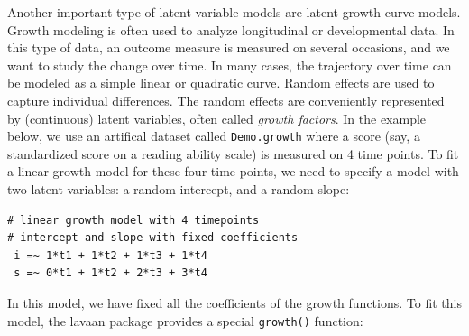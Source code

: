 Another important type of latent variable models are latent growth curve
models. Growth modeling is often used to analyze longitudinal or
developmental data. In this type of data, an outcome measure is measured
on several occasions, and we want to study the change over time. In many
cases, the trajectory over time can be modeled as a simple linear or
quadratic curve. Random effects are used to capture individual
differences. The random effects are conveniently represented by
(continuous) latent variables, often called \emph{growth factors}. In
the example below, we use an artifical dataset called
\texttt{Demo.growth} where a score (say, a standardized score on a
reading ability scale) is measured on 4 time points. To fit a linear
growth model for these four time points, we need to specify a model with
two latent variables: a random intercept, and a random slope:

\begin{verbatim}
# linear growth model with 4 timepoints
# intercept and slope with fixed coefficients
 i =~ 1*t1 + 1*t2 + 1*t3 + 1*t4
 s =~ 0*t1 + 1*t2 + 2*t3 + 3*t4
\end{verbatim}

In this model, we have fixed all the coefficients of the growth
functions. To fit this model, the lavaan package provides a special
\texttt{growth()} function:

\begin{Shaded}
\begin{Highlighting}[]
\StringTok{ }
\end{Highlighting}
\end{Shaded}

